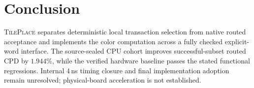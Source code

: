 \documentclass[conference,10pt]{IEEEtran}
\newcommand{\system}{\textsc{TilePlace}}
\begin{document}
\section{Conclusion}

\system{} separates deterministic local transaction selection from native
routed acceptance and implements the color computation across a fully
checked explicit-word interface. The source-sealed CPU cohort improves
successful-subset routed CPD by $1.944\%$, while the verified hardware
baseline passes the stated functional regressions. Internal 4\,ns timing
closure and final implementation adoption remain unresolved; physical-board
acceleration is not established.

\clearpage


\end{document}
